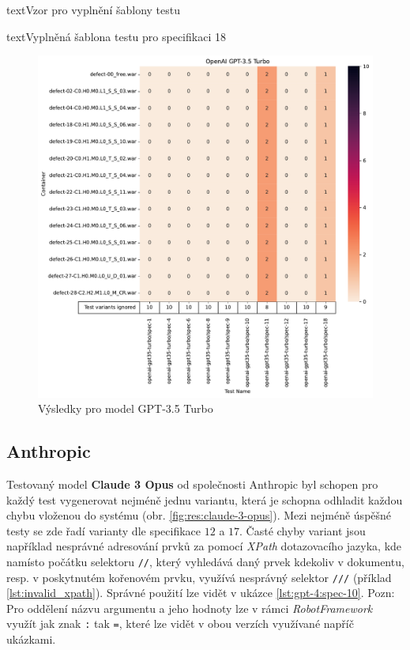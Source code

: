 \documentclass[czech, ma, kiv, he, iso690numb, pdf, viewonly]{fasthesis}
\begin{document}
\begin{code}{text}{Vzor pro vyplnění šablony testu \label{lst:template}}
{\begin{code}{text}{Vyplněná šablona testu pro specifikaci 18 \label{lst:spec18}}
{            \begin{figure}
                \includegraphics[width=\textwidth]{pic/gpt-3.5-turbo-results.pdf}
                \caption{Výsledky pro model GPT-3.5 Turbo}
                \label{fig:res:gpt-35-turbo}
            \end{figure}

        \subsection{Anthropic} \label{sec:res:anthropic}

            Testovaný model \textbf{Claude 3 Opus} od společnosti Anthropic byl schopen pro každý test vygenerovat nejméně jednu variantu, která je schopna odhladit každou chybu vloženou do systému (obr. \ref{fig:res:claude-3-opus}). Mezi nejméně úspěšné testy se zde řadí varianty dle specifikace \(12\) a \(17\). Časté chyby variant jsou například nesprávné adresování prvků za pomocí \textit{XPath} dotazovacího jazyka, kde namísto počátku selektoru \verb|//|, který vyhledává daný prvek kdekoliv v dokumentu, resp. v poskytnutém kořenovém prvku, využívá nesprávný selektor \verb|///| (příklad \ref{lst:invalid_xpath}). Správné použití lze vidět v ukázce \ref{lst:gpt-4:spec-10}. Pozn: Pro oddělení názvu argumentu a jeho hodnoty lze v rámci \textit{RobotFramework} využít jak znak \verb|:| tak \verb|=|, které lze vidět v obou verzích využívané napříč ukázkami.

}
\end{code}}
\end{code}
\end{document}
